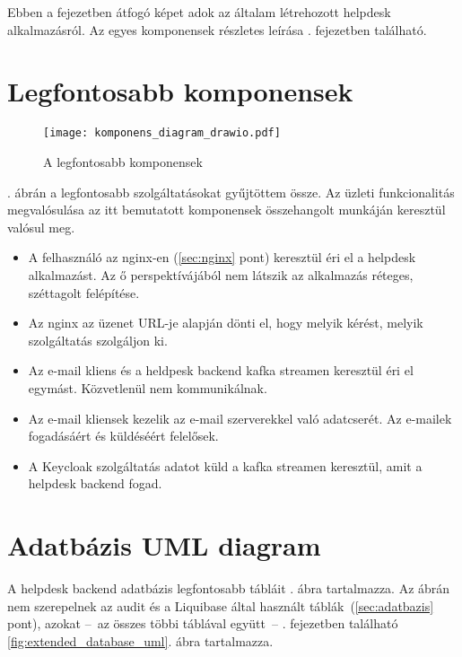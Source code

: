 Ebben a fejezetben átfogó képet adok az általam létrehozott helpdesk alkalmazásról. Az egyes komponensek részletes leírása . fejezetben található.

\section{Legfontosabb komponensek}

\begin{figure}[hbt] 
	\centering
	\texttt{[image: komponens\_diagram\_drawio.pdf]}
	\caption{A legfontosabb komponensek}
	\label{fig:komponens_diagram}
\end{figure}

. ábrán a legfontosabb szolgáltatásokat gyűjtöttem össze. Az üzleti funkcionalitás megvalósulása az itt bemutatott komponensek összehangolt munkáján keresztül valósul meg.


\begin{itemize}
	\item A felhasználó az nginx-en (\ref{sec:nginx} pont) keresztül éri el a helpdesk alkalmazást. Az ő perspektívájából nem látszik az alkalmazás réteges, széttagolt felépítése.
	\item Az nginx az üzenet URL-je alapján dönti el, hogy melyik kérést, melyik szolgáltatás szolgáljon ki.
	\item Az e-mail kliens és a heldpesk backend kafka streamen keresztül éri el egymást. Közvetlenül nem kommunikálnak.
	\item Az e-mail kliensek kezelik az e-mail szerverekkel való adatcserét. Az e-mailek fogadásáért és küldéséért felelősek.
	\item A Keycloak szolgáltatás adatot küld a kafka streamen keresztül, amit a helpdesk backend fogad.
\end{itemize}


\section{Adatbázis UML diagram}\label{sec:felepites_adatbazis}
A helpdesk backend adatbázis legfontosabb tábláit . ábra tartalmazza. Az ábrán nem szerepelnek az audit és a Liquibase által használt táblák~(\ref{sec:adatbazis} pont), azokat --~az összes többi táblával együtt~-- . fejezetben található \ref{fig:extended_database_uml}. ábra tartalmazza.
 
